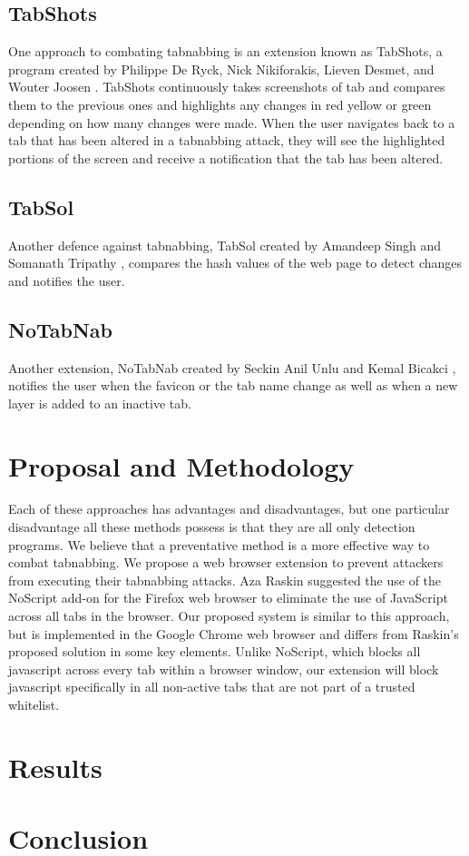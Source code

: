 \documentclass[12pt]{article}
\begin{document}
\begin{doublespace}
\subsection{TabShots}
One approach to combating tabnabbing is an extension known as TabShots, a program created by Philippe De Ryck, Nick Nikiforakis, Lieven Desmet, and Wouter Joosen \cite{TabShots}. TabShots continuously takes screenshots of tab and compares them to the previous ones and highlights any changes in red yellow or green depending on how many changes were made. When the user navigates back to a tab that has been altered in a tabnabbing attack, they will see the highlighted portions of the screen and receive a notification that the tab has been altered. 

\subsection{TabSol}
Another defence against tabnabbing, TabSol created by Amandeep Singh and Somanath Tripathy \cite{TabSol}, compares the hash values of the web page to detect changes and notifies the user. 

\subsection{NoTabNab}
Another extension, NoTabNab created by Seckin Anil Unlu and Kemal Bicakci \cite{NoTabNab}, notifies the user when the favicon or the tab name change as well as when a new layer is added to an inactive tab. 

\section{Proposal and Methodology}
Each of these approaches has advantages and disadvantages, but one particular disadvantage all these methods possess is that they are all only detection programs. We believe that a preventative method is a more effective way to combat tabnabbing.
We propose a web browser extension to prevent attackers from executing their tabnabbing attacks. Aza Raskin suggested the use of the NoScript add-on for the Firefox web browser to eliminate the use of JavaScript across all tabs in the browser.  Our proposed system is similar to this approach, but is implemented in the Google Chrome web browser and differs from Raskin’s proposed solution in some key elements. Unlike NoScript, which blocks all javascript across every tab within a browser window, our extension will block javascript specifically in all non-active tabs that are not part of a trusted whitelist.  

\section{Results}

\section{Conclusion}

\end{doublespace}




\end{document}
